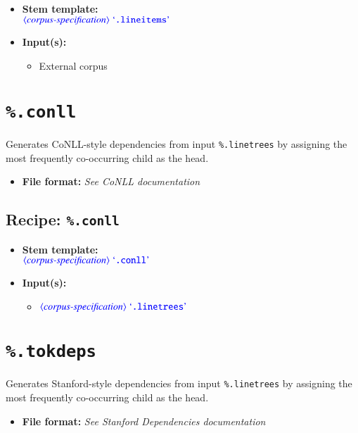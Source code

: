 \documentclass[12pt]{report}
\def\blue{\color{blue}}
\begin{document}
\begin{itemize}
      \item \textbf{Stem template:}\\
      $\dtype{corpus-specification} \ \dcode{.lineitems}$
      \item \textbf{Input(s):}
      \begin{itemize}
            \item External corpus
      \end{itemize}
\end{itemize}


\section{\blue\tt \%.conll}

Generates CoNLL-style dependencies from input {\blue\tt \%.linetrees} by assigning the most frequently co-occurring child as the head.

\begin{itemize}
\item\textbf{File format:} \textit{See CoNLL documentation}
\end{itemize}

\subsection{Recipe: {\blue\tt \%.conll}}

\begin{itemize}
      \item \textbf{Stem template:}\\
      $\dtype{corpus-specification} \ \dcode{.conll}$
      \item \textbf{Input(s):}
      \begin{itemize}
            \item $\dtype{corpus-specification} \ \dcode{.linetrees}$
      \end{itemize}
\end{itemize}

\section{\blue\tt \%.tokdeps}

Generates Stanford-style dependencies from input {\blue\tt \%.linetrees} by assigning the most frequently co-occurring child as the head.

\begin{itemize}
\item\textbf{File format:} \textit{See Stanford Dependencies documentation}
\end{itemize}
\end{document}
